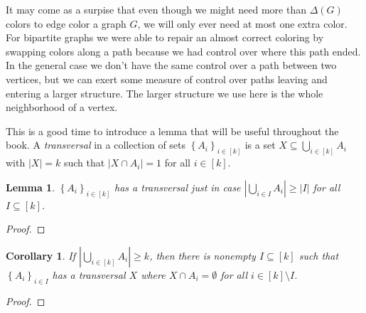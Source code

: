 \documentclass[openany]{tufte-book} %
\theoremstyle{plain}
\newtheorem{corollary}{Corollary}
\newtheorem{lemma}{Lemma}
\newcommand{\set}[1]{\left\{ #1 \right\}}
\newcommand{\card}[1]{\left|#1\right|}
\newcommand{\irange}[1]{\left[#1\right]}
\begin{document}
It may come as a surpise that even though we might need more than $\Delta(G)$ colors to edge color a graph $G$, we will only ever need at most one extra color.
For bipartite graphs we were able to repair an almost correct coloring by swapping colors along a path because we had control over where this path ended.  In the
general case we don't have the same control over a path between two vertices, but we can exert some measure of control over paths leaving and entering a larger structure. 
The larger structure we use here is the whole neighborhood of a vertex.

This is a good time to introduce a lemma that will be useful throughout the book.  
A \emph{transversal} in a collection of sets $\set{A_i}_{i \in \irange{k}}$ is a set $X \subseteq \bigcup_{i \in \irange{k}} A_i$ with $\card{X} = k$ such that $\card{X \cap A_i} = 1$
for all $i \in \irange{k}$.
\begin{lemma}
$\set{A_i}_{i \in \irange{k}}$ has a transversal just in case $\card{\bigcup_{i \in I} A_i} \ge \card{I}$ for all $I \subseteq \irange{k}$.
\end{lemma}
\begin{proof}
\end{proof}

\begin{corollary}\label{TransversalCorollary}
If $\card{\bigcup_{i \in \irange{k}} A_i} \ge k$, then there is nonempty $I \subseteq \irange{k}$ such that $\set{A_i}_{i \in I}$ has a transversal $X$ where $X \cap A_i = \emptyset$
for all $i \in \irange{k} \setminus I$.
\end{corollary}
\begin{proof}
\end{proof}
\end{document}
